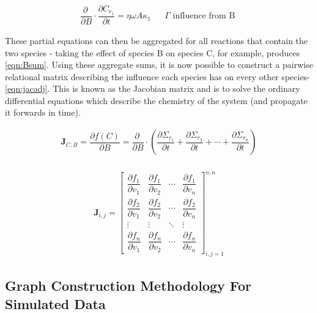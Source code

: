 \begin{eqnarray}
   \dfrac{\partial \ }{\partial B}\cdot \dfrac{\partial C_{r_1}}{\partial t} = \eta \omega A \kappa_1 & &  \Gamma \text{ influence from B }\label{eqn:B}%
\end{eqnarray}

These partial equations can then be aggregated for all reactions that contain the two species - taking the effect of species B on species C, for example, produces \autoref{eqn:Bsum}. Using these aggregate sums, it is now possible to construct a pairwise relational matrix describing the influence each species has on every other species- \autoref{eqn:jacadj}. This is known as the Jacobian matrix and is to solve the ordinary differential equations which describe the chemistry of the system (and propagate it forwards in time).


\begin{eqnarray}
   \mathbf{J}_{C,B} = \dfrac{\partial f(C) }{\partial B} =
\dfrac{\partial \ }{\partial B} \cdot \left( \dfrac{\partial \Sigma_{r_1}}{\partial t} + \dfrac{\partial \Sigma_{r_2}}{\partial t} + \cdots +\dfrac{\partial \Sigma_{r_n}}{\partial t} \right)
\label{eqn:Bsum}
\end{eqnarray}\\

\begin{eqnarray}
 \mathbf{J}_{i,j} =
 \begin{bmatrix}
   \dfrac{\partial f_1}{\partial v_1} &
     \dfrac{\partial f_1}{\partial v_2} &
     \cdots &
     \dfrac{\partial f_1}{\partial v_n} \\[13pt]
   \dfrac{\partial f_2}{\partial v_1} &
     \dfrac{\partial f_2}{\partial v_2} &
       \cdots &
     \dfrac{\partial f_2}{\partial v_n} \\[13pt]
       \vdots &
     \vdots & \ddots
        &
     \vdots\\[13pt]
   \dfrac{\partial f_n}{\partial v_1} &
     \dfrac{\partial f_n}{\partial v_2} &
       \cdots &
     \dfrac{\partial f_n}{\partial v_n}
 \end{bmatrix}_{i,j=1}^{n,n}
 \label{eqn:jacadj}
\end{eqnarray}



\subsection{Graph Construction Methodology For Simulated Data}\label{sec:graphconstruction}

